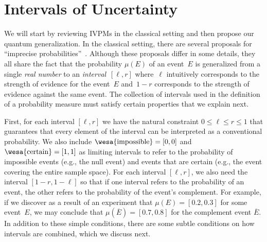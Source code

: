 \documentclass[english,reprint, aps, prl,superscriptaddress, showpacs,
showkeys, longbibliography, amsmath, amssymb]{revtex4-1}
\theoremstyle{plain}
\theoremstyle{definition}
\newcommand{\imposs}{{\text{\wesa{impossible}}}}
\newcommand{\necess}{{\text{\wesa{certain}}}}
\begin{document}
\section{Intervals of Uncertainty}
\label{sec:Interval-Uncertainty}

We will start by reviewing IVPMs in the classical setting and then
propose our quantum generalization. In the classical setting, there
are several proposals for ``imprecise
probabilities''~\citep{Dempster1967,Shafer1976,GilboaSchmeidler1994,Marinacci1999,Weichselberger2000,JamisonLodwick2004,HuberRonchetti2009,Grabisch2016}.
Although these proposals differ in some details, they all share the
fact that the probability $\mu(E)$ of an event~$E$ is generalized from
a single \emph{real number} to an \emph{interval}~$[\ell,r]$
where~$\ell$ intuitively corresponds to the strength of evidence for
the event~$E$ and~$1-r$ corresponds to the strength of evidence
against the same event. The collection of intervals used in the
definition of a probability measure must satisfy certain properties
that we explain next.

First, for each interval $[\ell,r]$ we have the natural constraint
$0 \leq \ell \leq r \leq 1$ that guarantees that every element of the
interval can be interpreted as a conventional probability. We also
include $\imposs=[0,0]$ and $\necess=[1,1]$ as limiting intervals to
refer to the probability of impossible events (e.g., the null event)
and events that are certain (e.g., the event covering the entire
sample space).  For each interval $[\ell,r]$, we also need the
interval $[1-r,1-\ell]$ so that if one interval refers to the
probability of an event, the other refers to the probability of the
event's complement.  For example, if we discover as a result of an
experiment that $\mu(E) = [0.2,0.3]$ for some event~$E$, we may
conclude that $\mu(\overline{E}) = [0.7,0.8]$ for the complement event
$\overline{E}$. In addition to these simple conditions, there are some
subtle conditions on how intervals are combined, which we discuss
next.
\end{document}
